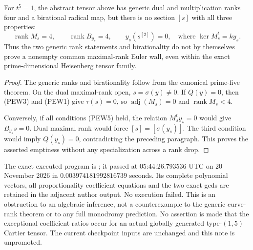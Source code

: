 \begin{proposition}
\label{prop:prime-five-empty-common-wall}
For \(t^5=1\), the abstract tensor above has generic dual and
multiplication ranks four and a birational radical map, but there
is no section \([s]\) with all three properties:
\[
 \operatorname{rank}M_s=4,\qquad
 \operatorname{rank}B_{y_s}=4,\qquad
 y_s(s^{[2]})=0,
 \quad\text{where }\ker M_s^t=k y_s.                 \tag{PEW5}
\]
Thus the two generic rank statements and birationality do not by
themselves prove a nonempty common maximal-rank Euler wall, even
within the exact prime-dimensional Heisenberg tensor family.
\end{proposition}
\begin{proof}
The generic ranks and birationality follow from the canonical
prime-five theorem. On the dual maximal-rank open,
\(s=\sigma(y)\ne0\). If \(Q(y)=0\), then (PEW3) and
(PEW1) give \(\tau(s)=0\), so
\(\operatorname{adj}(M_s)=0\) and \(\operatorname{rank}M_s<4\).

Conversely, if all conditions (PEW5) held, the relation
\(M_s^t y_s=0\) would give \(B_{y_s}s=0\). Dual maximal
rank would force \([s]=[\sigma(y_s)]\). The third condition
would imply \(Q(y_s)=0\), contradicting the preceding paragraph.
This proves the asserted emptiness without any specialization
across a rank drop.
\end{proof}

\begin{remark}
\label{rem:prime-five-empty-wall-scope}
The exact executed program is
; it passed
at 05:44:26.793536 UTC on 20 November 2026 in
\(0.003974181992816739\) seconds. Its complete polynomial vectors,
all proportionality coefficient equations and the two exact gcds
are retained in the adjacent author output. No execution failed.
This is an obstruction to an algebraic inference, not a
counterexample to the generic curve-rank theorem or to any full
monodromy prediction. No assertion is made that the exceptional
coefficient ratios occur for an actual globally generated
type-\((1,5)\) Cartier tensor. The current checkpoint inputs are
unchanged and this note is unpromoted.
\end{remark}
